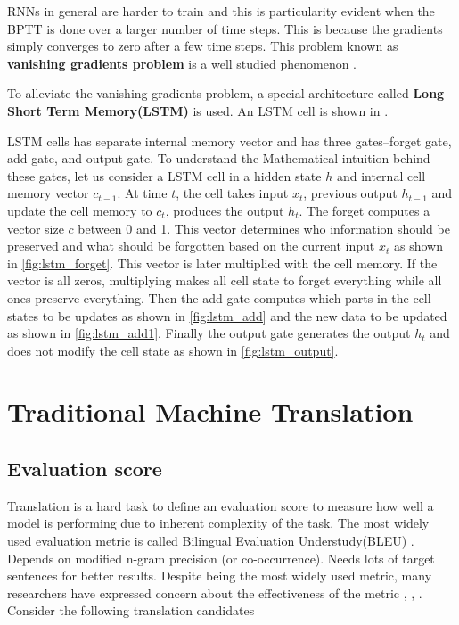 \documentclass[a4paper]{article}
\begin{document}
RNNs in general are harder  to train and this is particularity evident when  the
BPTT is done over a larger number of time  steps. This is because  the gradients
simply converges to  zero  after  a  few  time  steps.  This  problem  known  as
\textbf{vanishing   gradients   problem}   is   a    well   studied   phenomenon
\cite{bengio1994learning}.

To alleviate  the  vanishing  gradients problem,  a special  architecture called
\textbf{Long Short Term Memory(LSTM)} \cite{hochreiter1997long} is used. An LSTM
cell is shown in \label{fig:lstm}.

LSTM cells has separate internal memory vector and has three gates--forget gate,
add gate, and output gate. To understand the Mathematical intuition behind these
gates,  let us consider  a LSTM cell in  a  hidden state  $h$  and internal cell
memory  vector $c_{t-1}$. At  time $t$, the cell  takes  input  $x_t$,  previous
output  $h_{t-1}$  and  update the  cell memory to $c_{t}$,  produces the output
$h_{t}$. The forget computes a vector  size $c$ between  0  and  1. This  vector
determines who  information should be  preserved  and  what  should be forgotten
based on the current input  $x_t$ as shown in \ref{fig:lstm_forget}. This vector
is  later  multiplied with  the  cell  memory.  If  the  vector  is  all  zeros,
multiplying makes all  cell  state to forget everything while all ones  preserve
everything.  Then  the add gate computes which  parts in  the cell  states to be
updates as shown in  \ref{fig:lstm_add} and the new  data to be updated as shown
in \ref{fig:lstm_add1}. Finally  the output gate generates the output  $h_t$ and
does not modify the cell state as shown in \ref{fig:lstm_output}.


\section{Traditional Machine Translation}


\subsection{Evaluation score} Translation is a hard task to define an evaluation
score to  measure how  well a model  is performing due to inherent complexity of
the task. The most widely  used evaluation metric is called Bilingual Evaluation
Understudy(BLEU) \cite{papineni2002bleu}.  Depends on  modified n-gram precision
(or  co-occurrence). Needs  lots of target sentences for better results. Despite
being the most widely used metric, many researchers have expressed concern about
the    effectiveness     of     the     metric     \cite{zhang2004interpreting},
\cite{callison2006re}, \cite{ananthakrishnan2007some}.  Consider  the  following
translation candidates
\end{document}
